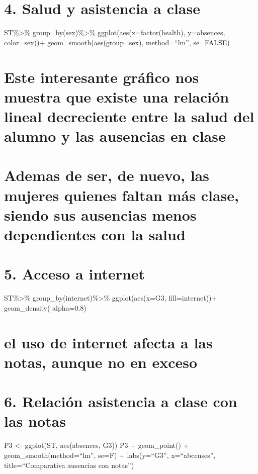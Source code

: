 \documentclass[]{article}
\begin{document}
\section{4. Salud y asistencia a
clase}\label{salud-y-asistencia-a-clase-1}

ST\%\textgreater{}\% group\_by(sex)\%\textgreater{}\%
ggplot(aes(x=factor(health), y=absences, color=sex))+
geom\_smooth(aes(group=sex), method=``lm'', se=FALSE)

\section{Este interesante gráfico nos muestra que existe una relación
lineal decreciente entre la salud del alumno y las ausencias en
clase}\label{este-interesante-grafico-nos-muestra-que-existe-una-relacion-lineal-decreciente-entre-la-salud-del-alumno-y-las-ausencias-en-clase}

\section{Ademas de ser, de nuevo, las mujeres quienes faltan más clase,
siendo sus ausencias menos dependientes con la
salud}\label{ademas-de-ser-de-nuevo-las-mujeres-quienes-faltan-mas-clase-siendo-sus-ausencias-menos-dependientes-con-la-salud}

\section{5. Acceso a internet}\label{acceso-a-internet-1}

ST\%\textgreater{}\% group\_by(internet)\%\textgreater{}\%
ggplot(aes(x=G3, fill=internet))+ geom\_density( alpha=0.8)

\section{el uso de internet afecta a las notas, aunque no en
exceso}\label{el-uso-de-internet-afecta-a-las-notas-aunque-no-en-exceso}

\section{6. Relación asistencia a clase con las
notas}\label{relacion-asistencia-a-clase-con-las-notas-1}

P3 \textless{}- ggplot(ST, aes(absences, G3)) P3 + geom\_point() +
geom\_smooth(method=``lm'', se=F) + labs(y=``G3'', x=``abcenses'',
title=``Comparativa ausencias con notas'')
\end{document}
